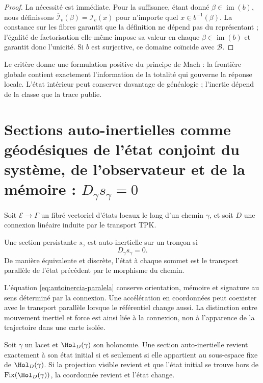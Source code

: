\begin{proof}
La nécessité est immédiate. Pour la suffisance, étant donné
\(\beta\in\operatorname{im}(b)\), nous définissons
\(\overline{\mathcal I}_v(\beta)=\mathcal I_v(x)\) pour n'importe quel
\(x\in b^{-1}(\beta)\). La constance sur les fibres garantit que la
définition ne dépend pas du représentant ; l'égalité de factorisation elle-même
impose sa valeur en chaque \(\beta\in\operatorname{im}(b)\) et garantit donc
l'unicité. Si \(b\) est surjective, ce domaine coïncide avec
\(\mathcal B\).
\end{proof}

Le critère donne une formulation positive du principe de Mach : la frontière
globale contient exactement l'information de la totalité qui gouverne la
réponse locale. L'état intérieur peut conserver davantage de généalogie ;
l'inertie dépend de la classe que la trace publie.

\section{Sections auto-inertielles comme géodésiques de l'état conjoint du système, de l'observateur et de la mémoire : \(D_\gamma s_\gamma=0\)}

Soit \(\mathcal E\to\Gamma\) un fibré vectoriel d'états locaux le long
d'un chemin \(\gamma\), et soit \(D\) une connexion linéaire induite par le
transport TPK.

\begin{definition}
Une section persistante \(s_\gamma\) est auto-inertielle sur un tronçon si
\begin{equation}
 D_\gamma s_\gamma=0.
 \label{eq:autoinercia-paralela}
\end{equation}
De manière équivalente et discrète, l'état à chaque sommet est le transport
parallèle de l'état précédent par le morphisme du chemin.
\end{definition}

L'équation \eqref{eq:autoinercia-paralela} conserve orientation, mémoire et
signature au sens déterminé par la connexion. Une accélération en coordonnées
peut coexister avec le transport parallèle lorsque le référentiel change
aussi. La distinction entre mouvement inertiel et force est ainsi liée à
la connexion, non à l'apparence de la trajectoire dans une carte isolée.

\begin{proposition}
\label{prop:autoinercia-holonomia}
Soit \(\gamma\) un lacet et \(\Hol_D(\gamma)\) son holonomie. Une section
auto-inertielle revient exactement à son état initial si et seulement si elle appartient au
sous-espace fixe de \(\Hol_D(\gamma)\). Si la projection visible revient et que
l'état initial se trouve hors de
\(\operatorname{Fix}(\Hol_D(\gamma))\), la coordonnée revient et
l'état change.
\end{proposition}

